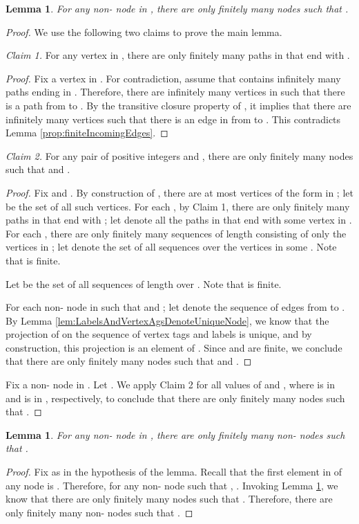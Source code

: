 \documentclass[11pt]{article}
\numberwithin{theorem}{section}
\newtheorem{lemma}[theorem]{Lemma}
\begin{document}
\begin{lemma}\label{lem:OnlyFinitelyManyNodesWithDPlusK}
For any non- node  in , there are only finitely many nodes  such that .
\end{lemma}
\begin{proof}
We use the following two claims to prove the main lemma.

\emph{Claim 1.} For any vertex  in , there are only finitely many paths in  that end with .
\begin{proof}
Fix a vertex  in . 
For contradiction, assume that  contains infinitely many paths ending in .
Therefore, there are infinitely many vertices  in  such that there is a path from  to .
By the transitive closure property of , it implies that there are infinitely many vertices  such that there is an edge in  from  to .
This contradicts Lemma \ref{prop:finiteIncomingEdges}.
\end{proof}

\emph{Claim 2.} For any pair of positive integers  and , there are only finitely many nodes  such that  and .
\begin{proof}
Fix  and . By construction of , there are at most  vertices  of the form  in ; let  be the set of all such vertices. For each , by Claim 1, there are only finitely many paths  in  that end with ; let  denote all the paths in  that end with some vertex in . For each , there are only finitely many sequences  of length  consisting of only the vertices in ; let  denote the set of all sequences over the vertices in some . Note that  is finite.

Let  be the set of all sequences of length  over . Note that  is finite.

For each non- node  in  such that  and ; let  denote the sequence of edges from  to . By Lemma \ref{lem:LabelsAndVertexAgsDenoteUniqueNode}, we know that the projection of  on the sequence of vertex tags and labels is unique, and by construction, this projection is an element of . Since  and  are finite, we conclude that there are only finitely many nodes  such that  and .
\end{proof}

Fix a non- node  in . Let . We apply Claim 2 for all values of  and , where  is in  and  is in , respectively, to conclude that there are only finitely many nodes  such that .
\end{proof}

\begin{lemma}\label{lem:finitelyManyNodesWithSmallerMetric}
For any non- node  in , there are only finitely many non- nodes  such that .
\end{lemma}
\begin{proof}
Fix  as in the hypothesis of the lemma. 
Recall that the first element in  of any node  is . Therefore, for any non- node  such that , .
Invoking Lemma \ref{lem:OnlyFinitelyManyNodesWithDPlusK}, we know that there are only finitely many nodes  such that . Therefore, there are only finitely many non- nodes  such that .
\end{proof}
\end{document}
